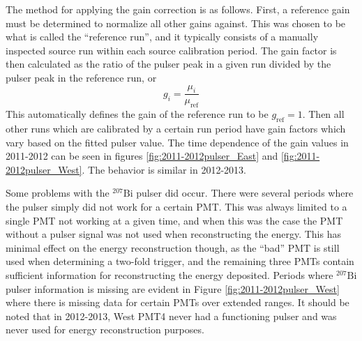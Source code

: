 The method for applying the gain correction is as follows. First, a reference gain must be determined
to normalize all other gains against. This was chosen to be what is called the ``reference run'', and it
typically consists of a manually inspected source run within each source calibration period. The gain factor
is then calculated as the ratio of the pulser peak in a given run divided by the pulser peak in the reference
run, or
%
\begin{equation}
  g_i = \frac{\mu_i}{\mu_{\mathrm{ref}}}
\end{equation}
%
This automatically defines the gain of the reference run to be $g_{\mathrm{ref}}=1$. Then all other runs which are
calibrated by a certain run period have gain factors which vary based on the fitted pulser value. The time
dependence of the gain values in 2011-2012 can be seen in figures \ref{fig:2011-2012pulser_East}
and \ref{fig:2011-2012pulser_West}. The behavior is similar in 2012-2013.

Some problems with the $^{207}\mathrm{Bi}$ pulser did occur. There were several periods where the pulser
simply did not work for a certain PMT. This was always limited to a single PMT not working at a given time, and when this
was the case the PMT without a pulser signal was not used when reconstructing the energy. This has
minimal effect on the energy reconstruction though, as the ``bad'' PMT is still used when determining
a two-fold trigger, and the remaining three PMTs contain sufficient information for reconstructing the
energy deposited. Periods where $^{207}\mathrm{Bi}$ pulser information is missing are evident in
Figure \ref{fig:2011-2012pulser_West} where there is missing data for certain PMTs over extended ranges.
It should be noted that in 2012-2013, West PMT4 never had a functioning pulser and was never used for
energy reconstruction purposes.

